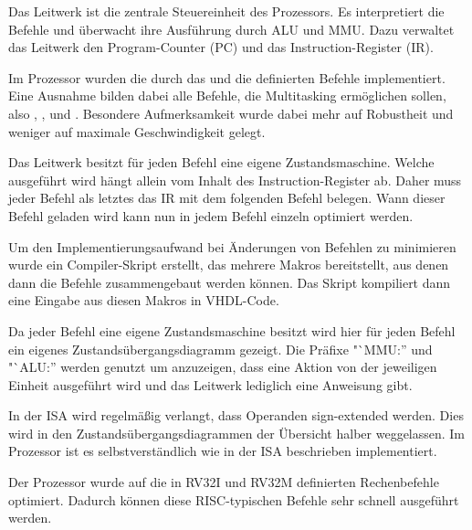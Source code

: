 Das Leitwerk ist die zentrale Steuereinheit des Prozessors. Es interpretiert
die Befehle und \"uberwacht ihre Ausf\"uhrung durch ALU und MMU. Dazu verwaltet
das Leitwerk den Program-Counter (PC) und das Instruction-Register (IR).

Im Prozessor wurden die durch das 
und die  definierten Befehle implementiert. Eine Ausnahme bilden dabei alle
Befehle, die Multitasking erm\"oglichen sollen, also 
\nolinebreak{}, \nolinebreak{},  und
. Besondere Aufmerksamkeit wurde dabei mehr auf Robustheit und
weniger auf maximale Geschwindigkeit gelegt.

Das Leitwerk besitzt f\"ur jeden Befehl eine eigene Zustandsmaschine. Welche
ausgef\"uhrt wird h\"angt allein vom Inhalt des Instruction-Register ab. Daher
muss jeder Befehl als letztes das IR mit dem folgenden Befehl belegen. Wann
dieser Befehl geladen wird kann nun in jedem Befehl einzeln optimiert werden.

Um den Implementierungsaufwand bei \"Anderungen von Befehlen zu minimieren
wurde ein Compiler-Skript erstellt, das mehrere Makros bereitstellt, aus denen
dann die Befehle zusammengebaut werden k\"onnen. Das Skript kompiliert dann
eine Eingabe aus diesen Makros in VHDL-Code.

Da jeder Befehl eine eigene Zustandsmaschine besitzt wird hier f\"ur jeden
Befehl ein eigenes Zustands\-\"uber\-gangs\-dia\-gramm gezeigt. Die Pr\"afixe
"`MMU:'' und "`ALU:'' werden genutzt um anzuzeigen, dass eine Aktion von der
jeweiligen Einheit ausgef\"uhrt wird und das Leitwerk lediglich eine Anweisung
gibt.

In der ISA wird regelm\"a\ss{}ig verlangt, dass Operanden sign-extended werden.
Dies wird in den Zustands\-\"uber\-gangs\-dia\-grammen der \"Ubersicht halber
weggelassen. Im Prozessor ist es selbstverst\"andlich wie in der ISA
beschrieben implementiert.

Der Prozessor wurde auf die in RV32I und RV32M definierten Rechenbefehle
optimiert. Dadurch k\"onnen diese RISC-typischen Befehle sehr schnell
ausgef\"uhrt werden.


